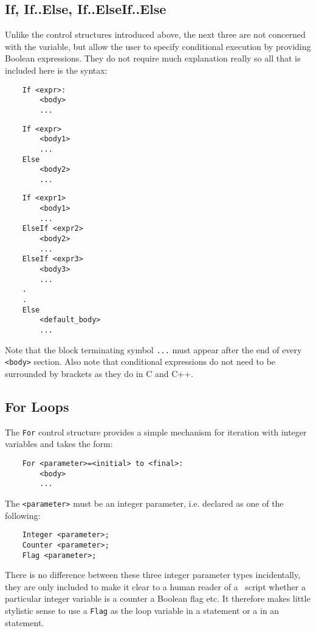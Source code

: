 \subsection{If, If..Else, If..ElseIf..Else}
Unlike the control structures introduced above, the next three are not
concerned with the  variable, but allow the user to specify
conditional execution by providing Boolean expressions. They do not require
much explanation really so all that is included here is the syntax:

\begin{verbatim}
    If <expr>:
        <body>
        ...
\end{verbatim}

\begin{verbatim}
    If <expr>
        <body1>
        ...
    Else
        <body2>
        ...
\end{verbatim}

\begin{verbatim}
    If <expr1>
        <body1>
        ...
    ElseIf <expr2>
        <body2>
        ...
    ElseIf <expr3>
        <body3>
        ...
    .
    .
    Else
        <default_body>
        ...
\end{verbatim}

Note that the block terminating symbol \verb|...| must appear after
the end of every \verb|<body>| section. Also note that conditional
expressions do not need to be surrounded by brackets as they do in C
and C++.

\subsection{For Loops}
The \verb|For| control structure provides a simple mechanism for iteration
with integer variables and takes the form:

\begin{verbatim}
    For <parameter>=<initial> to <final>:
        <body>
        ...
\end{verbatim}

The \verb|<parameter>| must be an integer parameter, i.e. declared
as one of the following:

\begin{verbatim}
    Integer <parameter>;
    Counter <parameter>;
    Flag <parameter>;
\end{verbatim}

There is no difference between these three integer parameter types
incidentally, they are only included to make it clear to a human
reader of a \tao\ script whether a particular integer variable is
a counter a Boolean flag etc. It therefore makes little stylistic sense
to use a \verb|Flag| as the loop variable in a  statement or a
 in an  statement. 

